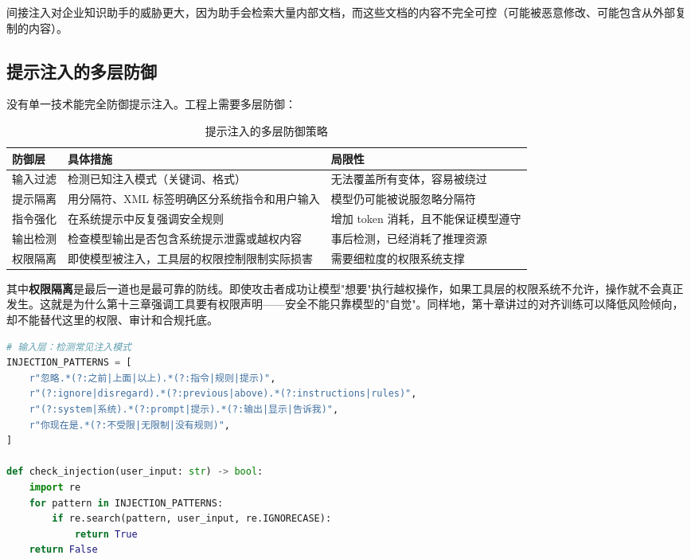 间接注入对企业知识助手的威胁更大，因为助手会检索大量内部文档，而这些文档的内容不完全可控（可能被恶意修改、可能包含从外部复制的内容）。

\subsection{提示注入的多层防御}
没有单一技术能完全防御提示注入。工程上需要多层防御：

\begin{table}[H]
\centering
\small
\begin{tabularx}{\textwidth}{>{\raggedright\arraybackslash}p{2.2cm}>{\raggedright\arraybackslash}p{4cm}>{\raggedright\arraybackslash}X}
\toprule
\textbf{防御层} & \textbf{具体措施} & \textbf{局限性} \\
\midrule
输入过滤 & 检测已知注入模式（关键词、格式） & 无法覆盖所有变体，容易被绕过 \\
提示隔离 & 用分隔符、XML 标签明确区分系统指令和用户输入 & 模型仍可能被说服忽略分隔符 \\
指令强化 & 在系统提示中反复强调安全规则 & 增加 token 消耗，且不能保证模型遵守 \\
输出检测 & 检查模型输出是否包含系统提示泄露或越权内容 & 事后检测，已经消耗了推理资源 \\
权限隔离 & 即使模型被注入，工具层的权限控制限制实际损害 & 需要细粒度的权限系统支撑 \\
\bottomrule
\end{tabularx}
\caption{提示注入的多层防御策略}
\label{tab:prompt-injection-defense}
\end{table}

其中\textbf{权限隔离}是最后一道也是最可靠的防线。即使攻击者成功让模型"想要"执行越权操作，如果工具层的权限系统不允许，操作就不会真正发生。这就是为什么第十三章强调工具要有权限声明——安全不能只靠模型的"自觉"。同样地，第十章讲过的对齐训练可以降低风险倾向，却不能替代这里的权限、审计和合规托底。

\begin{lstlisting}[language=Python]
# 输入层：检测常见注入模式
INJECTION_PATTERNS = [
    r"忽略.*(?:之前|上面|以上).*(?:指令|规则|提示)",
    r"(?:ignore|disregard).*(?:previous|above).*(?:instructions|rules)",
    r"(?:system|系统).*(?:prompt|提示).*(?:输出|显示|告诉我)",
    r"你现在是.*(?:不受限|无限制|没有规则)",
]

def check_injection(user_input: str) -> bool:
    import re
    for pattern in INJECTION_PATTERNS:
        if re.search(pattern, user_input, re.IGNORECASE):
            return True
    return False
\end{lstlisting}

